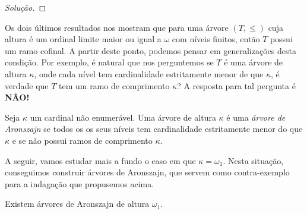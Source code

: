 \documentclass[a4paper]{article}
\begin{document}
\begin{proof}[Solução]
  
  \end{proof}
  

  Os dois últimos resultados nos mostram que para uma árvore \((T,\leq)\) cuja altura é um
  ordinal limite maior ou igual a \(\omega\) com níveis finitos, então \(T\)
  possui um ramo cofinal. A partir deste ponto, podemos pensar em generalizações
  desta condição. Por exemplo, é natural que nos perguntemos se $T$ é uma árvore
  de altura $\kappa$, onde cada nível tem cardinalidade estritamente menor de
  que \(\kappa\), é verdade que $T$ tem um
  ramo de comprimento $\kappa$?  A resposta para tal pergunta é \textbf{NÃO!}

  \begin{definition}
    Seja \(\kappa\) um cardinal não enumerável.
    Uma árvore de altura $\kappa$ é uma \textit{árvore de Aronszajn} se
    todos os os seus níveis tem cardinalidade estritamente menor do que \(\kappa\)
    e se não possui ramos de comprimento $\kappa$.
  \end{definition}

 A seguir, vamos estudar mais a fundo o caso em que \(\kappa=\omega_1\). Nesta
  situação, conseguimos construir árvores de Aronszajn, que servem como
  contra-exemplo  para a indagação que propusemos acima.
  
    \begin{teo}
  Existem árvores de Aronszajn de altura $\omega_1$.
    \end{teo}
\end{document}
